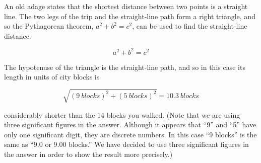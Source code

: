 \documentclass[../../main-ap-physics.tex]{subfiles}
\begin{document}
\vspace{1em}

An old adage states that the shortest distance between two points is a straight line. The two legs of the trip and the straight-line path form a right triangle, and so the Pythagorean theorem,  $a^2 + b^2 = c^2$, can be used to find the straight-line distance.

\begin{equation}
    a^2 + b^2 = c^2
\end{equation}

\begin{center}
    \captionsetup{type=figure,margin=1in,font=scriptsize}
\end{center}

The hypotenuse of the triangle is the straight-line path, and so in this case its length in units of city blocks is 

\begin{equation*}
    \sqrt{\left(\SI{9}{blocks}\right)^2 + \left(\SI{5}{blocks}\right)^2} = \SI{10.3}{blocks}
\end{equation*}

considerably shorter than the 14 blocks you walked. (Note that we are using three significant figures in the answer. Although it appears that ``9'' and ``5'' have only one significant digit, they are discrete numbers. In this case ``9 blocks'' is the same as ``9.0 or 9.00 blocks.'' We have decided to use three significant figures in the answer in order to show the result more precisely.)
\end{document}
